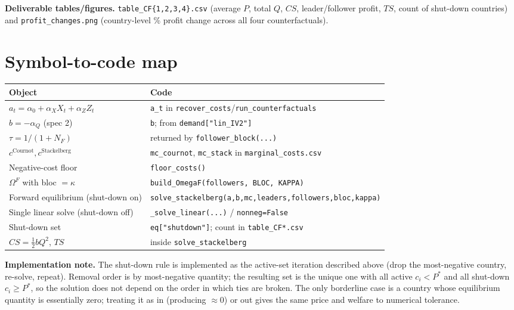 \documentclass[11pt]{article}
\newcommand{\1}{\mathbf{1}}
\newcommand{\Om}{\Omega}
\newcommand{\OmF}{\Om^{F}}
\begin{document}
\noindent\textbf{Deliverable tables/figures.} \texttt{table\_CF\{1,2,3,4\}.csv}
(average $P$, total $Q$, $CS$, leader/follower profit, $TS$, count of shut-down
countries) and \texttt{profit\_changes.png} (country-level \% profit change across
all four counterfactuals).

\appendix
\section{Symbol-to-code map}
\begin{center}\small
\begin{tabular}{ll}
\toprule
Object & Code \\
\midrule
$a_t=\alpha_0+\alpha_X X_t+\alpha_Z Z_t$ & \texttt{a\_t} in \texttt{recover\_costs}/\texttt{run\_counterfactuals}\\
$b=-\alpha_Q$ (spec 2) & \texttt{b}; from \texttt{demand["lin\_IV2"]}\\
$\tau=1/(1+N_F)$ & returned by \texttt{follower\_block(...)}\\
$c^{\text{Cournot}},c^{\text{Stackelberg}}$ & \texttt{mc\_cournot}, \texttt{mc\_stack} in \texttt{marginal\_costs.csv}\\
Negative-cost floor & \texttt{floor\_costs()}\\
$\OmF$ with bloc $=\kappa$ & \texttt{build\_OmegaF(followers, BLOC, KAPPA)}\\
Forward equilibrium (shut-down on) & \texttt{solve\_stackelberg(a,b,mc,leaders,followers,bloc,kappa)}\\
Single linear solve (shut-down off) & \texttt{\_solve\_linear(...)} / \texttt{nonneg=False}\\
Shut-down set & \texttt{eq["shutdown"]}; count in \texttt{table\_CF*.csv}\\
$CS=\tfrac12bQ^2$, $TS$ & inside \texttt{solve\_stackelberg}\\
\bottomrule
\end{tabular}
\end{center}

\noindent\textbf{Implementation note.} The shut-down rule is implemented as the
active-set iteration described above (drop the most-negative country, re-solve,
repeat). Removal order is by most-negative quantity; the resulting set is the
unique one with all active $c_i<P^\ast$ and all shut-down $c_i\ge P^\ast$, so the
solution does not depend on the order in which ties are broken. The only borderline
case is a country whose equilibrium quantity is essentially zero; treating it as in
(producing $\approx0$) or out gives the same price and welfare to numerical
tolerance.
\end{document}
